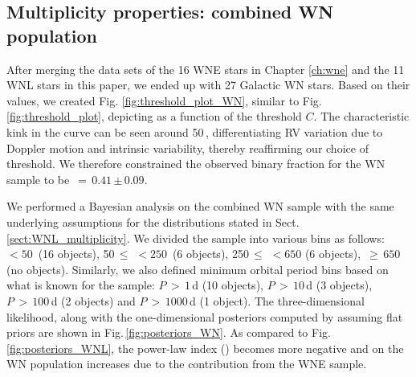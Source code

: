 \subsection{Multiplicity properties: combined WN population}  \label{sect:WN_multiplicity}
After merging the data sets of the 16 WNE stars in Chapter \ref{ch:wne} and the 11 WNL stars in this paper, we ended up with 27 Galactic WN stars. Based on their \DelRV{} values, we created Fig. \ref{fig:threshold_plot_WN}, similar to Fig. \ref{fig:threshold_plot}, depicting \fobsWN{} as a function of the threshold $C$. The characteristic kink in the curve can be seen around 50\,\kms{}, differentiating RV variation due to Doppler motion and intrinsic variability, thereby reaffirming our choice of threshold. We therefore constrained the observed binary fraction for the WN sample to be \fobsWN{}\,$=\,0.41$\,$\pm$\,$0.09$.

We performed a Bayesian analysis on the combined WN sample with the same underlying assumptions for the distributions stated in Sect. \ref{sect:WNL_multiplicity}. We divided the sample into various \DelRV{} bins as follows: \DelRV{}\,$< 50\,$\kms{} (16 objects), 50\,$\le$\,\DelRV{}\,$<250\,$\kms{} (6 objects), 250\,$\le$\,\DelRV{}\,$<650$ (6 objects), \DelRV{}\,$\ge\,650$\,\kms{} (no objects). Similarly, we also defined minimum orbital period bins based on what is known for the sample: $P\,>\,1\,$d (10 objects), $P\,>\,10\,$d (3 objects), $P\,>\,100\,$d (2 objects) and $P\,>\,1000\,$d (1 object). The three-dimensional likelihood, along with the one-dimensional posteriors computed by assuming flat priors are shown in Fig.\,\ref{fig:posteriors_WN}. As compared to Fig.\,\ref{fig:posteriors_WNL}, the power-law index (\piWN{}) becomes more negative and \fintWN{} on the WN population increases due to the contribution from the WNE sample.

